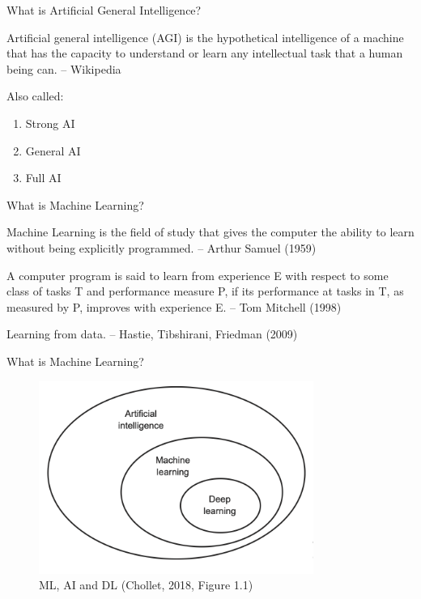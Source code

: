 \documentclass[10pt,handout]{beamer}
\begin{document}
\begin{frame}{What is Artificial General Intelligence?}

Artificial general intelligence (AGI) is the hypothetical intelligence of a machine that has the capacity to understand or learn any intellectual task that a human being can. -- Wikipedia

Also called:
\begin{enumerate}
\item Strong AI
\item General AI
\item Full AI
\end{enumerate}

\end{frame}



\begin{frame}{What is Machine Learning?}

Machine Learning is the field of study that gives the computer the ability to learn without being explicitly programmed. -- Arthur Samuel (1959)

A computer program is said to learn from experience E with respect to some class of tasks T and performance measure P, if its performance at tasks in T, as measured by P, improves with experience E. -- Tom Mitchell (1998)\pause

Learning from data. -- Hastie, Tibshirani, Friedman (2009)
\end{frame}


\begin{frame}{What is Machine Learning?}

\begin{figure}[h]
\caption{ML, AI and DL (Chollet, 2018, Figure 1.1)}
\centering
\includegraphics[width=0.8\textwidth]{figs/fig1_1_chollet.png}
\end{figure}

\end{frame}
\end{document}
